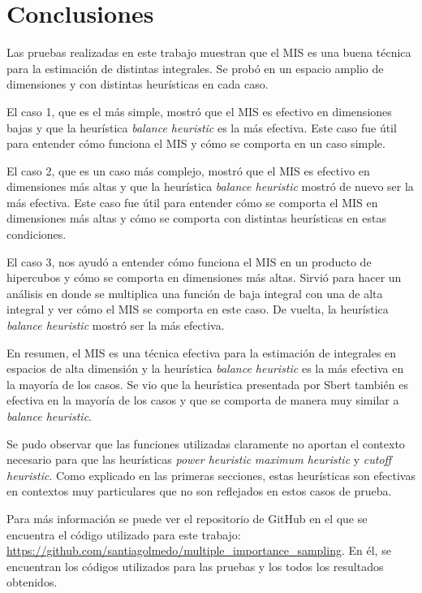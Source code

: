 \documentclass{article}
\begin{document}
\section{Conclusiones}

Las pruebas realizadas en este trabajo muestran que el MIS es una buena técnica para la estimación de distintas integrales.
Se probó en un espacio amplio de dimensiones y con distintas heurísticas en cada caso.

El caso 1, que es el más simple, mostró que el MIS es efectivo en dimensiones bajas y que la heurística \textit{balance heuristic} es la más efectiva.
Este caso fue útil para entender cómo funciona el MIS y cómo se comporta en un caso simple.

El caso 2, que es un caso más complejo, mostró que el MIS es efectivo en dimensiones más altas y que la heurística \textit{balance heuristic} mostró de nuevo ser la más efectiva.
Este caso fue útil para entender cómo se comporta el MIS en dimensiones más altas y cómo se comporta con distintas heurísticas en estas condiciones.

El caso 3, nos ayudó a entender cómo funciona el MIS en un producto de hipercubos y cómo se comporta en dimensiones más altas.
Sirvió para hacer un análisis en donde se multiplica una función de baja integral con una de alta integral y ver cómo el MIS se comporta en este caso.
De vuelta, la heurística \textit{balance heuristic} mostró ser la más efectiva.

En resumen, el MIS es una técnica efectiva para la estimación de integrales en espacios de alta dimensión y la heurística \textit{balance heuristic} es la más efectiva en la mayoría de los casos.
Se vio que la heurística presentada por Sbert también es efectiva en la mayoría de los casos y que se comporta de manera muy similar a \textit{balance heuristic}.

Se pudo observar que las funciones utilizadas claramente no aportan el contexto necesario para que las heurísticas \textit{power heuristic} \textit{maximum heuristic} y \textit{cutoff heuristic}.
Como explicado en las primeras secciones, estas heurísticas son efectivas en contextos muy particulares que no son reflejados en estos casos de prueba.

Para más información se puede ver el repositorio de GitHub en el que se encuentra el código utilizado para este trabajo: \url{https://github.com/santiagolmedo/multiple_importance_sampling}.
En él, se encuentran los códigos utilizados para las pruebas y los todos los resultados obtenidos.
\end{document}

